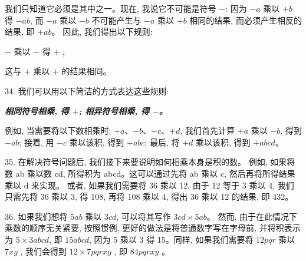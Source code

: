 我们只知道它必须是其中之一。现在, 我说它不可能是符号 $-$: 因为 $-a$ 乘以 $+b$ 得 $-ab$, 
而 $-a$ 乘以 $-b$ 不可能产生与 $-a$ 乘以 $+b$ 相同的结果, 而必须产生相反的结果, 即 $+ab$。
因此, 我们得出以下规则:\par
 $-$ 乘以 $-$ 得 $+$ , \par
 这与 $+$ 乘以 $+$ 的结果相同。
\par
34. 我们可以用以下简洁的方式表达这些规则: \par
\textbf{\textit{相同符号相乘, 得 $+$; 相异符号相乘, 得 $-$。}} \par
例如, 当需要将以下数相乘时: $+a$、$-b$、$-c$、$+d$, 我们首先计算 $+a$ 乘以 $-b$, 
得到 $-ab$; 接着, 用 $-c$ 乘以该积, 得到 $+abc$; 最后, 将 $+d$ 乘以该积, 得到 $+abcd$。
\par
35. 在解决符号问题后, 我们接下来要说明如何相乘本身是积的数。
例如, 如果将数 ab 乘以数 cd, 所得积为 abcd。这可以通过先将 ab 乘以 c, 然后再将所得结果乘以 d 来实现。
或者, 如果我们需要将 36 乘以 12, 由于 12 等于 3 乘以 4, 我们只需先将 36 乘以 3, 得 108, 
再将 108 乘以 4, 得出 36 乘以 12 的结果, 即 432。
\par
36. 如果我们想将 $5ab$ 乘以 $3cd$, 可以将其写作 $3cd \times 5ab$。
然而, 由于在此情况下乘数的顺序无关紧要, 按照惯例, 更好的做法是将普通数字写在字母前, 
并将积表示为 $5 \times 3abcd$, 即 $15abcd$, 因为 5 乘以 3 得 15。同样, 
如果我们需要将 $12pqr$ 乘以 $7xy$ , 我们会得到 $12 \times 7pqrxy$ , 即 $84pqrxy$ 。